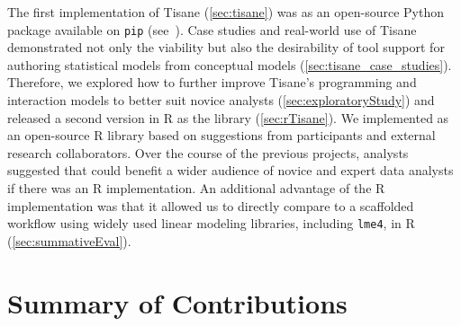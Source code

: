 The first implementation of Tisane (\autoref{sec:tisane}) was as an open-source
Python package available on \texttt{pip} (see~\cite{tisaneWebsite}). Case
studies and real-world use of Tisane demonstrated not only the viability but
also the desirability of tool support for authoring statistical models from
conceptual models (\autoref{sec:tisane_case_studies}). Therefore, we explored
how to further improve Tisane's programming and interaction models to better
suit novice analysts (\autoref{sec:exploratoryStudy}) and released a second
version in R as the \rTisane library \cite{jun2023rTisane}
(\autoref{sec:rTisane}). We implemented \rTisane as an open-source R library based on suggestions
from participants and external research collaborators. Over the course of the
previous projects, analysts suggested that \tisane could benefit a wider
audience of novice and expert data analysts if there was an R implementation.
An additional advantage of the R implementation was that it allowed us to directly
compare \rTisane to a scaffolded workflow using widely used linear modeling
libraries, including \texttt{lme4}, in R (\autoref{sec:summativeEval}). 














\section{Summary of Contributions}


